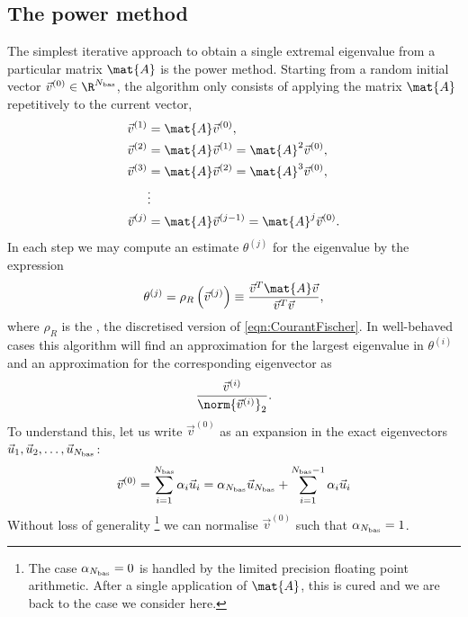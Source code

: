 \subsection{The power method}
\label{sec:Power}
The simplest iterative approach to obtain a single extremal eigenvalue
from a particular matrix $\mat{A}$ is the power method.
Starting from a random initial vector $\vec{v}^{(0)} \in \R^{\Nbas}$,
the algorithm only consists of applying the matrix $\mat{A}$
repetitively to the current vector, \ie
\begin{equation}
\begin{aligned}
	\vec{v}^{(1)} &= \mat{A} \vec{v}^{(0)}, \\
	\vec{v}^{(2)} &= \mat{A} \vec{v}^{(1)} = \mat{A}^2 \vec{v}^{(0)}, \\
	\vec{v}^{(3)} &= \mat{A} \vec{v}^{(2)} = \mat{A}^3 \vec{v}^{(0)}, \\
	&\vdots \\
	\vec{v}^{(j)} &= \mat{A} \vec{v}^{(j-1)} = \mat{A}^j \vec{v}^{(0)}.
\end{aligned}
	\label{eqn:PowerScheme}
\end{equation}
In each step we may compute an estimate $\theta^{(j)}$ for the eigenvalue by
the expression
\begin{equation}
	\theta^{(j)} = \rho_R\left(\vec{v}^{(j)}\right) \equiv
	\frac{\vec{v}^T \mat{A} \vec{v}}{\vec{v}^T \vec{v}},
	\label{eqn:RayleighQuotient}
\end{equation}
where $\rho_R$ is the ,
the discretised version of \eqref{eqn:CourantFischer}.
In well-behaved cases this algorithm will find an approximation for
the largest eigenvalue in $\theta^{(i)}$
and an approximation for the corresponding eigenvector as
\[ \frac{\vec{v}^{(i)}}{\norm{\vec{v}^{(i)}}_2}. \]
To understand this,
let us write $\vec{v}^{(0)}$ as an expansion in the exact
eigenvectors \linebreak $\vec{u}_1, \vec{u}_2, \ldots, \vec{u}_{N_\text{bas}}$:
\begin{equation}
	\vec{v}^{(0)} = \sum_{i=1}^{N_\text{bas}} \alpha_i \vec{u}_i = \alpha_{N_\text{bas}} \vec{u}_{N_\text{bas}} + \sum_{i=1}^{N_\text{bas}-1} \alpha_i \vec{u}_i
	\label{eqn:Vexpansion}
\end{equation}
Without loss of generality%
\footnote{The case $\alpha_{N_\text{bas}} = 0$ is handled by the limited precision
floating point arithmetic. After a single application of $\mat{A}$,
this is cured and we are back to the case we consider here.}
we can normalise $\vec{v}^{(0)}$ such that $\alpha_{N_\text{bas}} = 1$.
